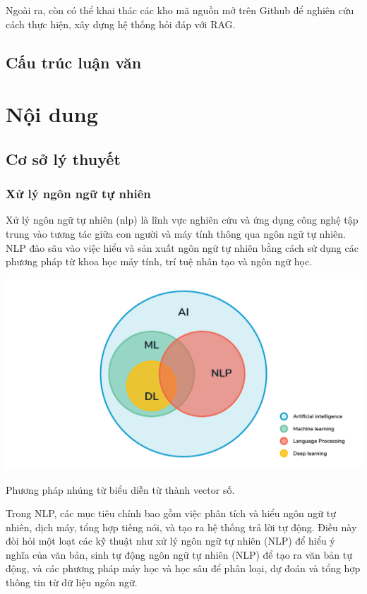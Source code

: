 \documentclass[a4paper, 12pt, openany]{book}
\begin{document}
Ngoài ra, còn có thể khai thác các kho mã nguồn mở trên Github để nghiên cứu cách thực hiện, xây dựng hệ thống hỏi đáp với RAG.

\section{Cấu trúc luận văn}


\chapter{Nội dung}

\section{Cơ sở lý thuyết}
\subsection{Xử lý ngôn ngữ tự nhiên}
Xử lý ngôn ngữ tự nhiên (\ac{nlp}) là lĩnh vực nghiên cứu và ứng dụng công nghệ tập trung vào tương tác giữa con người và máy tính thông qua ngôn ngữ tự nhiên. NLP đào sâu vào việc hiểu và sản xuất ngôn ngữ tự nhiên bằng cách sử dụng các phương pháp từ khoa học máy tính, trí tuệ nhân tạo và ngôn ngữ học.

\vspace{0.5cm}
\begin{minipage}{\linewidth}
    \captionsetup{type=figure}
    \centering
    \includegraphics[width=\linewidth]{./assets/images/nln.png}
    \caption{Phương pháp nhúng từ biểu diễn từ thành vector số.}
\end{minipage}
\vspace{0.5cm}


Trong NLP, các mục tiêu chính bao gồm việc phân tích và hiểu ngôn ngữ tự nhiên, dịch máy, tổng hợp tiếng nói, và tạo ra hệ thống trả lời tự động. Điều này đòi hỏi một loạt các kỹ thuật như xử lý ngôn ngữ tự nhiên (NLP) để hiểu ý nghĩa của văn bản, sinh tự động ngôn ngữ tự nhiên (NLP) để tạo ra văn bản tự động, và các phương pháp máy học và học sâu để phân loại, dự đoán và tổng hợp thông tin từ dữ liệu ngôn ngữ.
\end{document}
